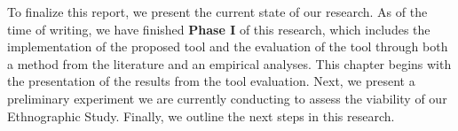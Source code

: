 \en 




To finalize this report, we present the current state of our research. As of the 
time of writing, we have finished \textbf{Phase I} of this research, 
which includes the implementation of 
the proposed tool and the evaluation of the tool through both a method from the 
literature and an empirical analyses. This chapter begins with the presentation of 
the results from the tool evaluation. Next, we present a preliminary experiment 
we are currently conducting to assess the viability of our Ethnographic Study. 
Finally, we outline the next steps in this research.





